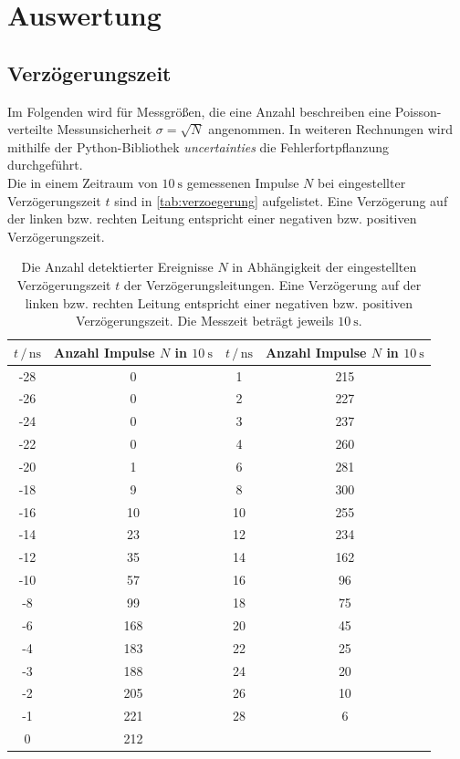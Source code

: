 \section{Auswertung}
\label{sec:Auswertung}

\subsection{Verzögerungszeit}
Im Folgenden wird für Messgrößen, die eine Anzahl beschreiben eine Poisson-verteilte Messunsicherheit $\sigma = \sqrt{N}$ angenommen.
In weiteren Rechnungen wird mithilfe der Python-Bibliothek \textit{uncertainties}\cite{uncertainties} die Fehlerfortpflanzung durchgeführt.
\\
Die in einem Zeitraum von $\qty{10}{\second}$ gemessenen Impulse $N$ bei eingestellter Verzögerungszeit $t$ sind in \autoref{tab:verzoegerung} aufgelistet.
Eine Verzögerung auf der linken bzw. rechten Leitung entspricht einer negativen bzw. positiven Verzögerungszeit.
\begin{table}
    \centering
    \caption{Die Anzahl detektierter Ereignisse $N$ in Abhängigkeit der eingestellten Verzögerungszeit $t$ der Verzögerungsleitungen.
    Eine Verzögerung auf der linken bzw. rechten Leitung entspricht einer negativen bzw. positiven Verzögerungszeit.
    Die Messzeit beträgt jeweils $\qty{10}{\second}$.
    }
    \label{tab:verzoegerung}
    \begin{tabular}{cc|cc}
        \toprule
        $t \,/\, \unit{\nano\second}$ & Anzahl Impulse $N$ in $\qty{10}{\second}$ & $t \,/\, \unit{\nano\second}$ & Anzahl Impulse $N$ in $\qty{10}{\second}$ \\
        \midrule
        -28 & 0 & 1 & 215 \\
        -26 & 0 & 2 & 227 \\
        -24 & 0 & 3 & 237 \\
        -22 & 0 & 4 & 260 \\
        -20 & 1 & 6 & 281 \\
        -18 & 9 & 8 & 300 \\
        -16 & 10 & 10 & 255 \\
        -14 & 23 & 12 & 234 \\
        -12 & 35 & 14 & 162 \\
        -10 & 57 & 16 & 96 \\
        -8 & 99 & 18 & 75 \\
        -6 & 168 & 20 & 45 \\
        -4 & 183 & 22 & 25 \\
        -3 & 188 & 24 & 20 \\
        -2 & 205 & 26 & 10 \\
        -1 & 221 & 28 & 6 \\
        0 & 212 & & \\
        \bottomrule
    \end{tabular}
\end{table}
